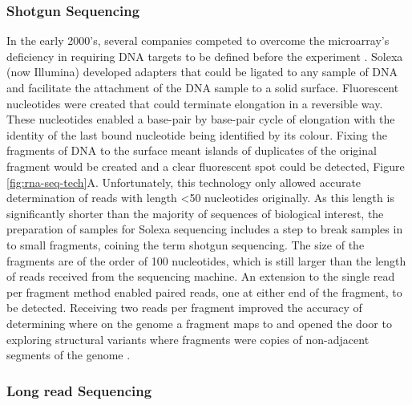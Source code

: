\documentclass[../main.tex]{subfiles}
\begin{document}
\subsubsection{Shotgun Sequencing}

In the early 2000's, several companies competed to overcome the microarray's deficiency in requiring DNA targets to be defined before the experiment \parencite{Rusk2007}.
Solexa (now Illumina) developed adapters that could be ligated to any sample of DNA and facilitate the attachment of the DNA sample to a solid surface. 
Fluorescent nucleotides were created that could terminate elongation in a reversible way.
These nucleotides enabled a base-pair by base-pair cycle of elongation with the identity of the last bound nucleotide being identified by its colour.
Fixing the fragments of DNA to the surface meant islands of duplicates of the original fragment would be created and a clear fluorescent spot could be detected, Figure \ref{fig:rna-seq-tech}A.
Unfortunately, this technology only allowed accurate determination of reads with length <50 nucleotides originally.
As this length is significantly shorter than the majority of sequences of biological interest, the preparation of samples for Solexa sequencing includes a step to break samples in to small fragments, coining the term shotgun sequencing.
The size of the fragments are of the order of 100 nucleotides, which is still larger than the length of reads received from the sequencing machine.
An extension to the single read per fragment method enabled paired reads, one at either end of the fragment, to be detected.
Receiving two reads per fragment improved the accuracy of determining where on the genome a fragment maps to and opened the door to exploring structural variants where fragments were copies of non-adjacent segments of the genome \parencite{Risca2015}.

\subsubsection{Long read Sequencing}
\end{document}
